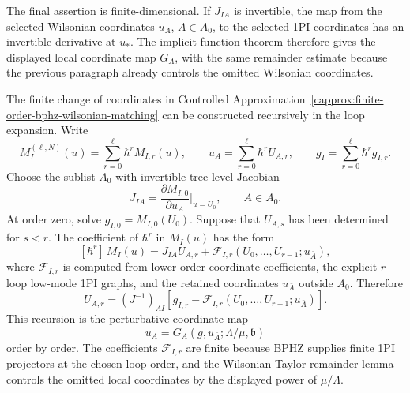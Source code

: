 The final assertion is finite-dimensional.  If \(J_{IA}\) is invertible, the
map from the selected Wilsonian coordinates \(u_A\), \(A\in A_0\), to the
selected 1PI coordinates has an invertible derivative at \(u_*\).  The
implicit function theorem therefore gives the displayed local coordinate
map \(G_A\), with the same remainder estimate because the previous paragraph
already controls the omitted Wilsonian coordinates.

The finite change of coordinates in
Controlled Approximation~\ref{capprox:finite-order-bphz-wilsonian-matching}
can be constructed recursively in the loop expansion.  Write
\[
  M_I^{(\ell,N)}(u)
  =
  \sum_{r=0}^{\ell}\hbar^r M_{I,r}(u),
  \qquad
  u_A
  =
  \sum_{r=0}^{\ell}\hbar^r U_{A,r},
  \qquad
  g_I
  =
  \sum_{r=0}^{\ell}\hbar^r g_{I,r}.
\]
Choose the sublist \(A_0\) with invertible tree-level Jacobian
\[
  J_{IA}=
  \frac{\partial M_{I,0}}{\partial u_A}\bigg|_{u=U_0},
  \qquad A\in A_0 .
\]
At order zero, solve \(g_{I,0}=M_{I,0}(U_0)\).  Suppose that
\(U_{A,s}\) has been determined for \(s<r\).  The coefficient of
\(\hbar^r\) in \(M_I(u)\) has the form
\[
  [\hbar^r]\,M_I(u)
  =
  J_{IA}U_{A,r}
  +
  \mathcal F_{I,r}(U_0,\ldots,U_{r-1};u_{\bar A}),
\]
where \(\mathcal F_{I,r}\) is computed from lower-order coordinate
coefficients, the explicit \(r\)-loop low-mode 1PI graphs, and the retained
coordinates \(u_{\bar A}\) outside \(A_0\).  Therefore
\[
  U_{A,r}
  =
  (J^{-1})_{AI}
  \left[
    g_{I,r}
    -
    \mathcal F_{I,r}(U_0,\ldots,U_{r-1};u_{\bar A})
  \right].
\]
This recursion is the perturbative coordinate map
\[
  u_A=G_A(g,u_{\bar A};\Lambda/\mu,\mathfrak b)
\]
order by order.  The coefficients
\(\mathcal F_{I,r}\) are finite because BPHZ supplies finite 1PI projectors at
the chosen loop order, and the Wilsonian Taylor-remainder lemma controls the
omitted local coordinates by the displayed power of \(\mu/\Lambda\).

